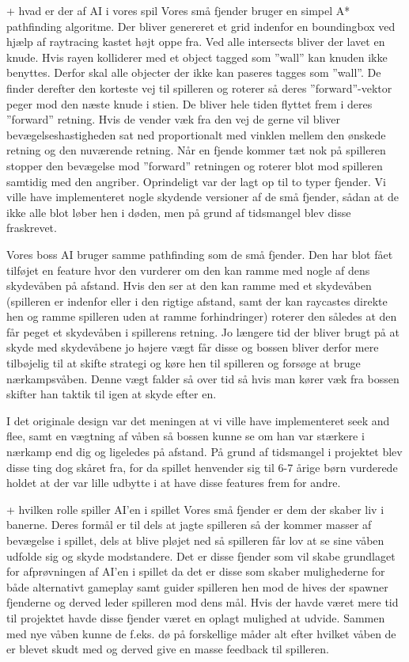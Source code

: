                 + hvad er der af AI i vores spil
Vores små fjender bruger en simpel A* pathfinding algoritme. Der bliver genereret et grid indenfor en boundingbox ved hjælp af raytracing kastet højt oppe fra. Ved alle intersects bliver der lavet en knude. Hvis rayen kolliderer med et object tagged som ''wall'' kan knuden ikke benyttes. Derfor skal alle objecter der ikke kan paseres tagges som ''wall''.
De finder derefter den korteste vej til spilleren og roterer så deres ''forward''-vektor peger mod den næste knude i stien. De bliver hele tiden flyttet frem i deres ''forward'' retning. Hvis de vender væk fra den vej de gerne vil bliver bevægelseshastigheden sat ned proportionalt med vinklen mellem den ønskede retning og den nuværende retning.
Når en fjende kommer tæt nok på spilleren stopper den bevægelse mod ''forward'' retningen og roterer blot mod spilleren samtidig med den angriber. 
Oprindeligt var der lagt op til to typer fjender. Vi ville have implementeret nogle skydende versioner af de små fjender, sådan at de ikke alle blot løber hen i døden, men på grund af tidsmangel blev disse fraskrevet.

Vores boss AI bruger samme pathfinding som de små fjender. Den har blot fået tilføjet en feature hvor den vurderer om den kan ramme med nogle af dens skydevåben på afstand. Hvis den ser at den kan ramme med et skydevåben (spilleren er indenfor eller i den rigtige afstand, samt der kan raycastes direkte hen og ramme spilleren uden at ramme forhindringer) roterer den således at den får peget et skydevåben i spillerens retning. Jo længere tid der bliver brugt på at skyde med skydevåbene jo højere vægt får disse og bossen bliver derfor mere tilbøjelig til at skifte strategi og køre hen til spilleren og forsøge at bruge nærkampsvåben. Denne vægt falder så over tid så hvis man kører væk fra bossen skifter han taktik til igen at skyde efter en.

I det originale design var det meningen at vi ville have implementeret seek and flee, samt en vægtning af våben så bossen kunne se om han var stærkere i nærkamp end dig og ligeledes på afstand. På grund af tidsmangel i projektet blev disse ting dog skåret fra, for da spillet henvender sig til 6-7 årige børn vurderede holdet at der var lille udbytte i at have disse features frem for andre.


                + hvilken rolle spiller AI’en i spillet
Vores små fjender er dem der skaber liv i banerne. Deres formål er til dels at jagte spilleren så der kommer masser af bevægelse i spillet, dels at blive pløjet ned så spilleren får lov at se sine våben udfolde sig og skyde modstandere. Det er disse fjender som vil skabe grundlaget for afprøvningen af AI'en i spillet da det er disse som skaber mulighederne for både alternativt gameplay samt guider spilleren hen mod de hives der spawner fjenderne og derved leder spilleren mod dens mål. Hvis der havde været mere tid til projektet havde disse fjender været en oplagt mulighed at udvide. Sammen med nye våben kunne de f.eks. dø på forskellige måder alt efter hvilket våben de er blevet skudt med og derved give en masse feedback til spilleren.

